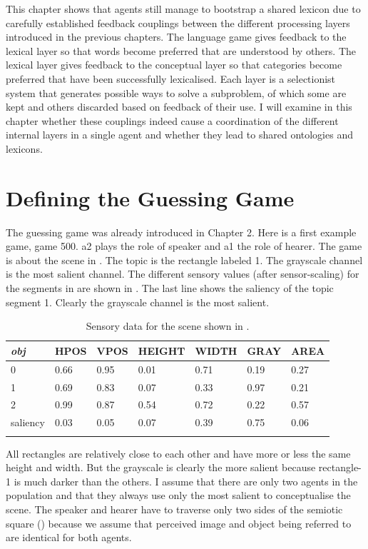 This chapter shows that agents still manage to 
bootstrap a shared lexicon due to carefully established
feedback couplings between the different processing
layers introduced in the previous chapters. 
The language game gives feedback to the lexical layer so 
that words become preferred that are understood by others.
The lexical layer gives feedback to the conceptual layer
so that categories become preferred that have been
successfully lexicalised. Each layer is a selectionist system
that generates possible ways to solve a subproblem, of which some 
are kept and others discarded based on feedback of their use.
I will examine in this chapter whether these
couplings indeed cause a coordination of the different internal
layers in a single agent and whether they lead to shared 
ontologies and lexicons. 

\section{Defining the Guessing Game}

The guessing game was already introduced in Chapter 2. Here is a first example game, game 500.
{\bfshape  a2} plays the role of speaker and {\bfshape  a1} the role of hearer. The game is about the scene in
. The topic is the rectangle labeled 1. The grayscale channel is the most 
salient channel. The different sensory values (after sensor-scaling)
for the segments in  are shown in 
. The last line shows the saliency of 
the topic segment 1.  Clearly the grayscale channel is the most salient. 


\begin{table}
\begin{center}
\begin{tabular}{ l  l  l  l  l  l  l }
\lsptoprule
{\itshape obj} & HPOS & VPOS & HEIGHT & WIDTH & GRAY & AREA \\ \midrule
0 & 0.66 & 0.95 & 0.01 & 0.71 & 0.19 & 0.27\\ 
1 & 0.69 & 0.83 & 0.07 & 0.33 & 0.97 & 0.21\\ 
2 & 0.99 & 0.87 & 0.54 & 0.72 & 0.22 & 0.57\\ 
saliency & 0.03 & 0.05 & 0.07 & 0.39 & 0.75 & 0.06 \\ 
\lspbottomrule
\end{tabular}
\caption{\label{tab:t-rect1}Sensory data for the scene shown in .}
\end{center}
\end{table}
All rectangles are relatively close to each other and have more or less the 
same height and width. But the grayscale is clearly the more salient because rectangle-1 is 
much darker than the others. I assume that there are only two agents in the population and that they always use only 
the most salient to conceptualise the scene. 
The speaker and hearer have to traverse only 
two sides of the semiotic square ()
because we assume that perceived image and object being
referred to are identical for both agents. 


